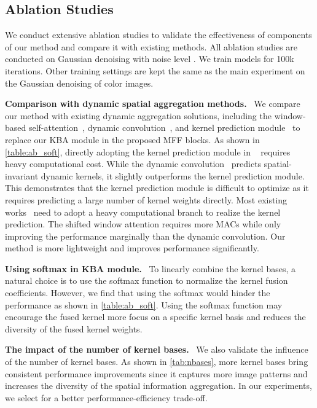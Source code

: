 \documentclass[default,iicol]{sn-jnl}
\theoremstyle{thmstyleone}\newtheorem{theorem}{Theorem}\newtheorem{proposition}[theorem]{Proposition}
\theoremstyle{thmstyletwo}\newtheorem{example}{Example}\newtheorem{remark}{Remark}
\theoremstyle{thmstylethree}\newtheorem{definition}{Definition}
\begin{document}
\subsection{Ablation Studies}
We conduct extensive ablation studies to validate the effectiveness of components of our method and compare it with existing methods.
All ablation studies are conducted on Gaussian denoising with noise level . 
We train models for 100k iterations. Other training settings are kept the same as the main experiment on the Gaussian denoising of color images.

\noindent\textbf{Comparison with dynamic spatial aggregation methods.}~
We compare our method with existing dynamic aggregation solutions, including the window-based self-attention~\cite{wang2021uformer}, dynamic convolution~\cite{AttOverConv20}, and kernel prediction module~\cite{kpn,Wang2019Carafe} to replace our KBA module in the proposed MFF blocks. 
As shown in \cref{table:ab_soft}, directly adopting the kernel prediction module in ~\cite{kpn} requires heavy computational cost. While the dynamic convolution~\cite{AttOverConv20} predicts spatial-invariant dynamic kernels, it slightly outperforms the kernel prediction module. 
This demonstrates that the kernel prediction module is difficult to optimize as it requires predicting a large number of kernel weights directly. Most existing works~\cite{kpn,mckpn,xia2020bpn} need to adopt a heavy computational branch to realize the kernel prediction.
The shifted window attention requires more MACs while only improving the performance marginally than the dynamic convolution.
Our method is more lightweight and improves performance significantly.


\noindent\textbf{Using softmax in KBA module.}~
To linearly combine the kernel bases, a natural choice is to use the softmax function to normalize the kernel fusion coefficients. 
However, we find that using the softmax would hinder the performance as shown in \cref{table:ab_soft}. 
Using the softmax function may encourage the fused kernel more focus on a specific kernel basis and reduces the diversity of the fused kernel weights.

\noindent\textbf{The impact of the number of kernel bases.}~
We also validate the influence of the number of kernel bases. As shown in \cref{tab:nbases}, more kernel bases bring consistent performance improvements since it captures more image patterns and increases the diversity of the spatial information aggregation. 
In our experiments, we select  for a better performance-efficiency trade-off.
\end{document}
